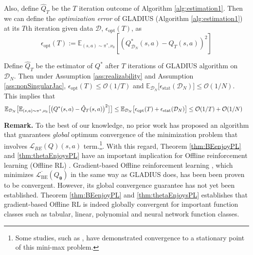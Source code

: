 \noindent Also, define $\hat{Q}_T$ be the $T$ iteration outcome of Algorithm \ref{alg:estimation1}. Then we can define the \textit{optimization error} of GLADIUS (Algorithm \ref{alg:estimation1}) at its $T$th iteration given data $\mathcal{D}$, $\epsilon_{\text{opt}}(T)$, as 
$$
\epsilon_{\text{opt}}(T):=\mathbb{E}_{(s, a) \sim \pi^*, \nu_0}\left[\left(Q^\ast_{\mathcal{D}_N}(s, a)-\hat{Q}_T(s, a)\right)^2\right] 
$$


\begin{prop}
\label{prop:linConvergence}
Define $\hat{Q}_T$ be the estimator of $Q^\ast$ after $T$ iterations of GLADIUS algorithm on $\mathcal{D}_N$. Then under Assumption \ref{ass:realizability} and Assumption \ref{ass:nonSingularJac}, $\epsilon_{\text{opt}}(T)\le\mathcal{O}(1/T)$ and $\mathbb{E}_{\mathcal{D}_N}\bigl[\epsilon_{\text{stat}}(\mathcal{D}_N)\bigr]\le \mathcal{O}(1/N)$. This implies that
\begin{align}
&\mathbb{E}_{\mathcal{D}_N}\bigl[\mathbb{E}_{(s, a) \sim \pi^*, \nu_0}\bigl[\bigl(Q^*(s, a)-\hat{Q}_T(s, a)\bigr)^2\bigr]\bigr]\le \mathbb{E}_{\mathcal{D}_N}\bigl[\epsilon_{\text{opt}}(T)+ \epsilon_{\text{stat}}(\mathcal{D}_N)\bigr]\le \mathcal{O}(1/T) + \mathcal{O}(1/N)\notag
\end{align}
\end{prop}

\noindent\textbf{Remark. }
To the best of our knowledge, no prior work has proposed an algorithm that guarantees \textit{global} optimum convergence of the minimization problem that involves $\mathcal{L}_{BE}(Q)(s,a)$ term.\footnote{Some studies, such as \cite{dai2018sbeed}, have demonstrated convergence to a stationary point of this mini-max problem.}. With this regard, Theorem \ref{thm:BEenjoyPL} and \ref{thm:thetaEnjoysPL} have an important implication for Offline reinforcement learning (Offline RL) \cite{jiangoffline}. Gradient-based Offline reinforcement learning \citep{antos2008learning, dai2018sbeed}, which minimizes $\overline{\mathcal{L}_{\mathrm{BE}}}(Q_{\boldsymbol{\theta}})$ in the same way as GLADIUS does, has been been proven to be convergent. However, its global convergence guarantee has not yet been established. Theorem \ref{thm:BEenjoyPL} and \ref{thm:thetaEnjoysPL} establishes that gradient-based Offline RL is indeed globally convergent for important function classes such as tabular, linear, polynomial and neural network function classes.
